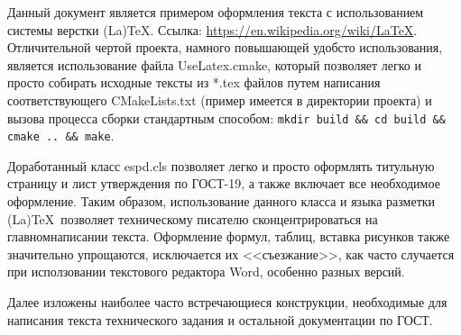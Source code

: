 \annotation

Данный документ является примером оформления текста с использованием системы верстки (La)\TeX. Ссылка: \url{https://en.wikipedia.org/wiki/LaTeX}. Отличительной чертой проекта, намного повышающей удобсто использования, является использование файла UseLatex.cmake, который позволяет легко и просто собирать исходные тексты из *.tex файлов путем написания соответствующего CMakeLists.txt (пример имеется в директории проекта) и вызова процесса сборки стандартным способом: \lstinline|mkdir build && cd build && cmake .. && make|.

Доработанный класс espd.cls позволяет легко и просто оформлять титульную страницу и лист утверждения по ГОСТ-19, а также включает все необходимое оформление. Таким образом, использование данного класса и языка разметки (La)\TeX~позволяет техническому писателю сконцентрироваться на главном\mdash написании текста. Оформление формул, таблиц, вставка рисунков также значительно упрощаются, исключается их <<съезжание>>, как часто случается при исползовании текстового редактора Word, особенно разных версий.

Далее изложены наиболее часто встречающиеся конструкции, необходимые для написания текста технического задания и остальной документации по ГОСТ.

%
%
%
